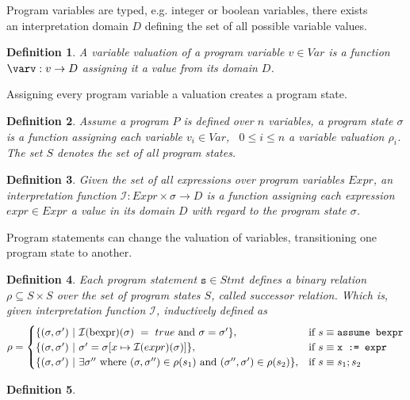 \documentclass{article}
\newcommand{\Var}{\ensuremath{\mathit{Var}}\xspace}
\newcommand{\stmt}{\ensuremath{\mathit{Stmt}}\xspace}
\newcommand{\interpret}{\ensuremath{\mathcal{I}}}
\newtheorem{mydef}{Definition}
\newcommand\mycom[1]{}
\newcommand\mycom[1]{#1}
\newcommand{\jw}[1]{\mycom{\todo[color=blue!40,inline]{\small JW: #1}}}
\newcommand{\dd}[1]{\mycom{\todo[color=orange!40,inline]{\small DD: #1}}}
\newcommand{\ts}[1]{\mycom{\todo[color=green!40,inline]{\small TS: #1}}}
\begin{document}
Program variables are typed, e.g. integer or boolean variables, there exists \\
an interpretation domain $D$ defining the set of all possible variable values.
\begin{mydef}
	A variable valuation of a program variable $v \in \Var$ is a function $\varv: v \rightarrow D$  assigning it a value from its domain $D$.
\end{mydef}
Assigning every program variable a valuation creates a program state.


\begin{mydef}
	Assume a program $P$ is defined over $n$ variables, a program state $\sigma$ is a function assigning each variable $v_i \in \Var$, \ $0 \leq i \leq n$ a variable valuation $\rho_i$. The set $S$ denotes the set of all program states.
\end{mydef}


\begin{mydef}
	Given the set of all expressions over program variables $\mathit{Expr}$, an interpretation function $\interpret: Expr \times \sigma \rightarrow D$ is a function assigning each expression $expr \in \mathit{Expr}$ a value in its domain $D$ with regard to the program state $\sigma$.
\end{mydef}


\ts{What is an interpretation function?}
\dd{Perhaps you should explain what your interpretation function is :p}

Program statements can change the valuation of variables, transitioning one program state to another.

\begin{mydef}
	Each program statement $\texttt{s} \in \stmt$ defines a binary relation $\rho \subseteq S \times S$ over the set of program states $S$, called successor relation. Which is, given interpretation function $\mathcal{I}$, inductively defined as
	$$ \rho =
		\begin{cases}
			\{(\sigma, \sigma')\ |\ \mathcal{I}(\text{bexpr})(\sigma)\ =\ true\ \text{and}\ \sigma = \sigma'\} ,                                        & \text{if}\ s \equiv \text{\texttt{assume bexpr}} \\
			\{(\sigma, \sigma')\ |\ \sigma' = \sigma[x \mapsto \mathcal{I}(expr)(\sigma)]\} ,                                                           & \text{if}\ s \equiv \texttt{x := expr}           \\
			\{(\sigma, \sigma')\ |\ \exists \sigma''\ \text{where}\ (\sigma, \sigma'') \in \rho(s_1)\ \text{and}\ (\sigma'', \sigma') \in \rho(s_2) \}, & \text{if}\ s \equiv \texttt{$s_1;s_2$}
		\end{cases}
	$$
\end{mydef}
\begin{mydef}
	\jw{Sets of States.}
\end{mydef}
\end{document}
